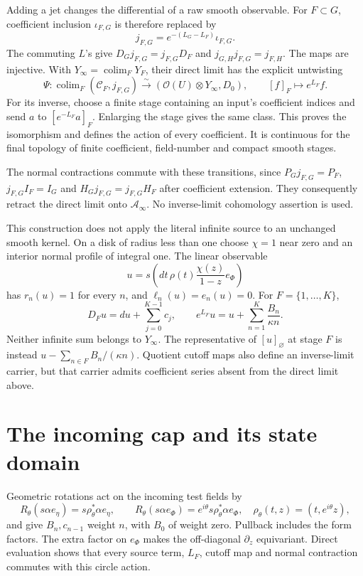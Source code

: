 Adding a jet changes the differential of a raw smooth observable.
For \(F\subset G\), coefficient inclusion \(\iota_{F,G}\) is therefore
replaced by
\begin{equation}\label{eq:vol2-native-cutoff-transition}
 j_{F,G}=e^{-(L_G-L_F)}\iota_{F,G}.
\end{equation}
The commuting \(L\)'s give
\(D_Gj_{F,G}=j_{F,G}D_F\) and \(j_{G,H}j_{F,G}=j_{F,H}\).
The maps are injective. With \(Y_\infty=\operatorname{colim}_F Y_F\),
their direct limit has the explicit untwisting
\begin{equation}\label{eq:vol2-native-all-jet-source}
 \Psi:\operatorname{colim}_F(\mathcal C_F,j_{F,G})
       \xrightarrow{\sim}(\mathcal O(U)\otimes Y_\infty,D_0),
 \qquad [f]_F\longmapsto e^{L_F}f.
\end{equation}
For its inverse, choose a finite stage containing an input's coefficient
indices and send \(a\) to \([e^{-L_F}a]_F\). Enlarging the stage gives
the same class. This proves the isomorphism and defines the action of
every coefficient. It is continuous for the final topology of finite
coefficient, field-number and compact smooth stages.

The normal contractions commute with these transitions, since
\(P_Gj_{F,G}=P_F\), \(j_{F,G}I_F=I_G\) and
\(H_Gj_{F,G}=j_{F,G}H_F\) after coefficient extension.
They consequently retract the direct limit onto \(\mathcal A_\infty\).
No inverse-limit cohomology assertion is used.

This construction does not apply the literal infinite source to an
unchanged smooth kernel. On a disk of radius less than one choose
\(\chi=1\) near zero and an interior normal profile of integral one.
The linear observable
\[
 u=s\left(dt\,\rho(t)\frac{\chi(z)}{1-z}e_\Phi\right)
\]
has \(r_n(u)=1\) for every \(n\), and \(\ell_n(u)=e_n(u)=0\).
For \(F=\{1,\ldots,K\}\),
\[
 D_Fu=du+\sum_{j=0}^{K-1}c_j,
 \qquad e^{L_F}u=u+\sum_{n=1}^K\frac{B_n}{\kappa n}.
\]
Neither infinite sum belongs to \(Y_\infty\).
The representative of \([u]_\varnothing\) at stage \(F\) is instead
\(u-\sum_{n\in F}B_n/(\kappa n)\).
Quotient cutoff maps also define an inverse-limit carrier, but that
carrier admits coefficient series absent from the direct limit above.

\section{The incoming cap and its state domain}

Geometric rotations act on the incoming test fields by
\[
 R_\theta(s\alpha e_\eta)=s\rho_\theta^*\alpha e_\eta,
 \qquad
 R_\theta(s\alpha e_\Phi)=e^{i\theta}s\rho_\theta^*\alpha e_\Phi,
 \quad \rho_\theta(t,z)=(t,e^{i\theta}z),
\]
and give \(B_n,c_{n-1}\) weight \(n\), with \(B_0\) of weight zero.
Pullback includes the form factors. The extra factor on \(e_\Phi\)
makes the off-diagonal \(\partial_z\) equivariant. Direct evaluation
shows that every source term, \(L_F\), cutoff map and normal contraction
commutes with this circle action.


